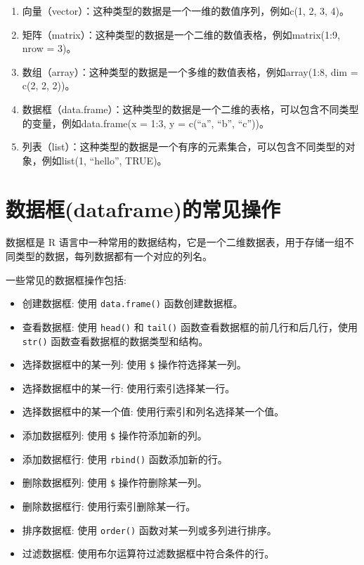 \documentclass[
  letterpaper,
  DIV=11,
  numbers=noendperiod]{scrreprt}
\providecommand{\tightlist}{%
  \setlength{\itemsep}{0pt}\setlength{\parskip}{0pt}}\usepackage{longtable,booktabs,array}
\begin{document}
\begin{enumerate}
\def\labelenumi{\arabic{enumi}.}
\item
  向量（vector）：这种类型的数据是一个一维的数值序列，例如c(1, 2, 3,
  4)。
\item
  矩阵（matrix）：这种类型的数据是一个二维的数值表格，例如matrix(1:9,
  nrow = 3)。
\item
  数组（array）：这种类型的数据是一个多维的数值表格，例如array(1:8, dim
  = c(2, 2, 2))。
\item
  数据框（data.frame）：这种类型的数据是一个二维的表格，可以包含不同类型的变量，例如data.frame(x
  = 1:3, y = c(``a'', ``b'', ``c''))。
\item
  列表（list）：这种类型的数据是一个有序的元素集合，可以包含不同类型的对象，例如list(1,
  ``hello'', TRUE)。
\end{enumerate}

\hypertarget{ux6570ux636eux6846dataframeux7684ux5e38ux89c1ux64cdux4f5c}{%
\section{数据框(dataframe)的常见操作}\label{ux6570ux636eux6846dataframeux7684ux5e38ux89c1ux64cdux4f5c}}

数据框是 R
语言中一种常用的数据结构，它是一个二维数据表，用于存储一组不同类型的数据，每列数据都有一个对应的列名。

一些常见的数据框操作包括:

\begin{itemize}
\tightlist
\item
  创建数据框: 使用 \texttt{data.frame()} 函数创建数据框。
\item
  查看数据框: 使用 \texttt{head()} 和 \texttt{tail()}
  函数查看数据框的前几行和后几行，使用 \texttt{str()}
  函数查看数据框的数据类型和结构。
\item
  选择数据框中的某一列: 使用 \texttt{\$} 操作符选择某一列。
\item
  选择数据框中的某一行: 使用行索引选择某一行。
\item
  选择数据框中的某一个值: 使用行索引和列名选择某一个值。
\item
  添加数据框列: 使用 \texttt{\$} 操作符添加新的列。
\item
  添加数据框行: 使用 \texttt{rbind()} 函数添加新的行。
\item
  删除数据框列: 使用 \texttt{\$} 操作符删除某一列。
\item
  删除数据框行: 使用行索引删除某一行。
\item
  排序数据框: 使用 \texttt{order()} 函数对某一列或多列进行排序。
\item
  过滤数据框: 使用布尔运算符过滤数据框中符合条件的行。
\end{itemize}
\end{document}
